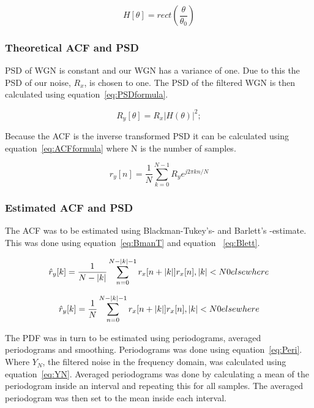 \documentclass[10pt]{article}
\begin{document}
\begin{equation}
  \label{eq:idealH}
  H[\theta] =rect(\frac{\theta}{\theta_0} )
\end{equation}

\subsubsection{Theoretical ACF and PSD}
PSD of WGN is constant and our WGN has a variance of one. Due to this the PSD of our noise, $R_x$, is chosen to one.
The PSD of the filtered WGN is then calculated using equation~\ref{eq:PSDformula}.

\begin{equation}
  \label{eq:PSDformula}
  R_y[\theta] = R_x|H(\theta)|^2;
\end{equation}

Because the ACF is the inverse transformed PSD it can be calculated using equation~\ref{eq:ACFformula} where N is the number of samples.

\begin{equation}
  \label{eq:ACFformula}
  r_y[n] = \frac{1}{N}\sum_{k=0}^{N-1}R_ye^{j2\pi kn/N}
\end{equation}

\subsubsection{Estimated ACF and PSD}
The ACF was to be estimated using Blackman-Tukey's- and Barlett's -estimate. This was done using equation~\ref{eq:BmanT} and equation ~\ref{eq:Blett}.

\begin{equation}
\label{eq:BmanT}
\hat{r}_y[k] = \frac{1}{N-|k|}\sum_{n=0}^{N-|k|-1}r_x[n+|k|]r_x[n], |k|<N \\
		0 elsewhere
\end{equation}

\begin{equation}
\label{eq:Blett}
\hat{r}_y[k] = \frac{1}{N}\sum_{n=0}^{N-|k|-1}r_x[n+|k|]r_x[n], |k|<N \\
		0 elsewhere
\end{equation}



The PDF was in turn to be estimated using periodograms, averaged periodograms and smoothing. Periodograms was done using equation~\ref{eq:Peri}. Where $Y_N$, the filtered noise in the frequency domain, was calculated using equation~\ref{eq:YN}. Averaged periodograms was done by calculating a mean of the periodogram inside an interval and repeating this for all samples. The averaged periodogram was then set to the mean inside each  interval.
\end{document}

